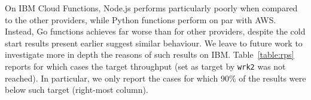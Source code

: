 On \gls{IBM} Cloud Functions, Node.js performs particularly poorly when compared to the other providers, while Python functions perform on par with \gls{AWS}.
Instead, Go functions achieves far worse than for other providers, despite the cold start results present earlier suggest similar behaviour. 
We leave to future work to investigate more in depth the reasons of such results on \gls{IBM}.
Table~\ref{table:rps} reports for which cases the target throughput (set as target by \texttt{wrk2} was not reached). 
In particular, we only report the cases for which 90\% of the results were below such target (right-most column).

